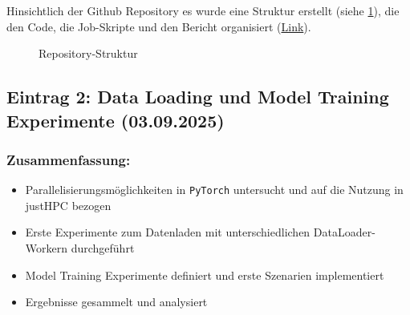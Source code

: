 \documentclass{article}
\begin{document}
Hinsichtlich der Github Repository es wurde eine Struktur erstellt (siehe \ref{fig:dir_structure}), die den Code, die Job-Skripte und den Bericht organisiert
(\href{https://github.com/marouane11119999/PyTorch-on-HPC}{Link}). 

\begin{figure}[h]
\centering
\fboxrule=2pt%
\caption{Repository-Struktur}
\label{fig:dir_structure}
\end{figure}



\subsection{Eintrag 2: Data Loading und Model Training Experimente (03.09.2025)}
\label{lab:eintrag2}
\subsubsection{Zusammenfassung:}
\begin{itemize}
    \item Parallelisierungsmöglichkeiten in \texttt{PyTorch} untersucht und auf die Nutzung in justHPC bezogen
    \item Erste Experimente zum Datenladen mit unterschiedlichen DataLoader-Workern durchgeführt
    \item Model Training Experimente definiert und erste Szenarien implementiert
    \item Ergebnisse gesammelt und analysiert
\end{itemize}
\end{document}
